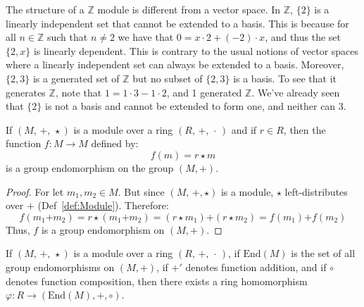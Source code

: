     The structure of a $\mathbb{Z}$ module is different from a vector space.
    In $\mathbb{Z}$, $\{2\}$ is a linearly independent set that cannot be
    extended to a basis. This is because for all $n\in\mathbb{Z}$ such that
    $n\ne{2}$ we have that $0=x\cdot{2}+(\minus{2})\cdot{x}$, and thus the set
    $\{2,x\}$ is linearly dependent. This is contrary to the usual notions of
    vector spaces where a linearly independent set can always be extended to a
    basis. Moreover, $\{2,3\}$ is a generated set of $\mathbb{Z}$ but no subset
    of $\{2,3\}$ is a basis. To see that it generates $\mathbb{Z}$, note that
    $1=1\cdot{3}-1\cdot{2}$, and 1 generated $\mathbb{Z}$. We've already seen
    that $\{2\}$ is not a basis and cannot be extended to form one, and neither
    can 3.
    \begin{theorem}
        \label{thm:Scalar_Mult_in_Module_Defines_Group_Endo}%
        If $(M,\,\boldsymbol{+},\,\star)$ is a module over a ring
        $(R,\,+,\,\cdot\,)$ and if $r\in{R}$, then the function
        $f:M\rightarrow{M}$ defined by:
        \begin{equation}
            f(m)=r\star{m}
        \end{equation}
        is a group endomorphism on the group $(M,\boldsymbol{+})$.
    \end{theorem}
    \begin{proof}
        For let $m_{1},m_{2}\in{M}$. But since $(M,\,\boldsymbol{+},\star)$
        is a module, $\star$ left-distributes over $\boldsymbol{+}$
        (Def~\ref{def:Module}). Therefore:
        \begin{equation}
            f(m_{1}\boldsymbol{+}m_{2})
            =r\star(m_{1}\boldsymbol{+}m_{2})
            =(r\star{m}_{1})\boldsymbol{+}(r\star{m}_{2})
            =f(m_{1})\boldsymbol{+}f(m_{2})
        \end{equation}
        Thus, $f$ is a group endomorphism on $(M,\boldsymbol{+})$.
    \end{proof}
    \begin{theorem}
        If $(M,\,\boldsymbol{+},\,\star)$ is a module over a ring
        $(R,\,+,\,\cdot\,)$, if $\textrm{End}(M)$ is the set of all
        group endomorphisms on $(M,\boldsymbol{+})$, if $\boldsymbol{+}'$
        denotes function addition, and if $\circ$ denotes function composition,
        then there exists a ring homomorphism
        $\varphi:R\rightarrow(\textrm{End}(M),\boldsymbol{+},\circ)$.
    \end{theorem}
